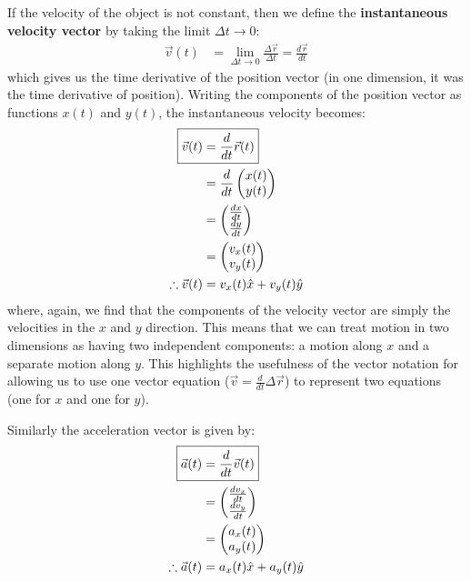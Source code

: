 If the velocity of the object is not constant, then we define the \textbf{instantaneous velocity vector} by taking the limit $\Delta t\to 0$:
\begin{align}
\vec v(t) &= \lim_{\Delta t \to 0}\frac{\Delta \vec r}{\Delta t}=\frac{d\vec r}{dt}
\end{align}
which gives us the time derivative of the position vector (in one dimension, it was the time derivative of position). Writing the components of the position vector as functions $x(t)$ and $y(t)$, the instantaneous velocity becomes:
\begin{align}
\label{eqn:describingmotioninnd:vvecdef}
\Aboxed{\vec v(t) &=\frac{d}{dt}\vec r(t) }\\
&=\frac{d}{dt} \begin{pmatrix}
           x(t) \\
           y(t) \\
         \end{pmatrix}\nonumber\\ 
&=\begin{pmatrix}
           \frac{dx}{dt}  \\
          \frac{dy}{dt}  \\
         \end{pmatrix}\nonumber\\ 
 &=\begin{pmatrix}
           v_x(t) \\
           v_y(t) \\
         \end{pmatrix}\nonumber\\   
\therefore \vec v(t) &= v_x(t)\hat x+v_y(t)\hat y  \nonumber     
\end{align}
where, again, we find that the components of the velocity vector are simply the velocities in the $x$ and $y$ direction. This means that we can treat motion in two dimensions as having two independent components: a motion along $x$ and a separate motion along $y$. This highlights the usefulness of the vector notation for allowing us to use one vector equation ($\vec v=\frac{d}{dt}\Delta \vec r$) to represent two equations (one for $x$ and one for $y$). 

Similarly the acceleration vector is given by:
\begin{align}
\label{eqn:describingmotioninnd:avecdef}
\Aboxed{\vec a(t) &= \frac{d}{dt}\vec v(t)} \\
&=\begin{pmatrix}
           \frac{dv_x}{dt}  \\
          \frac{dv_y}{dt}  \\
         \end{pmatrix}\nonumber\\
&=\begin{pmatrix}
           a_x(t) \\
           a_y(t) \\
         \end{pmatrix}\nonumber\\
\therefore \vec a(t) &= a_x(t)\hat x+a_y(t)\hat y      \nonumber        
\end{align}

